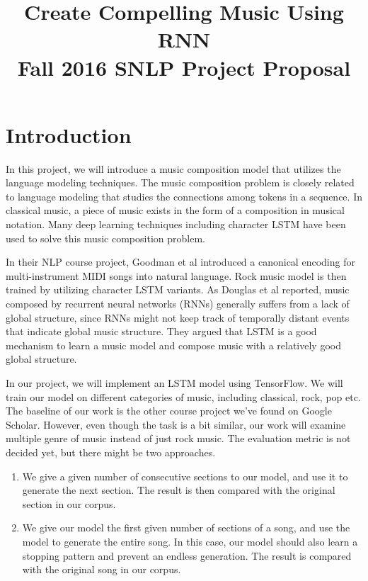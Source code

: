 \documentclass[10pt,journal]{IEEEtran}
\title{Create Compelling Music Using RNN\\
{\Large Fall 2016 SNLP Project Proposal}}
\author{
\IEEEauthorblockN{Qi Feng\IEEEauthorrefmark{1},
Zhiyu Feng\IEEEauthorrefmark{2},
Wenliang Zhao\IEEEauthorrefmark{3}
}

\IEEEauthorblockA{Department of Computer Science,
New York University\\
New York, NY\\
Email: \IEEEauthorrefmark{1}qf264@nyu.edu,
\IEEEauthorrefmark{2}zf499@nyu.edu,
\IEEEauthorrefmark{3}wz927@nyu.edu}}
\begin{document}
\maketitle
\section{Introduction}
In this project, we will introduce a music composition model that utilizes the language modeling techniques.
The music composition problem is closely related to language modeling that studies the connections among tokens in a sequence.
In classical music, a piece of music exists in the form of a composition in musical notation.
Many deep learning techniques including character LSTM have been used to solve this music composition problem.

In their NLP course project\cite{goodmancs}, Goodman et al introduced a canonical encoding for multi-instrument MIDI songs into natural language.
Rock music model is then trained by utilizing character LSTM variants.
As Douglas et al reported\cite{eck2002first}, music composed by recurrent neural networks (RNNs) generally suffers from a lack of global structure,
since RNNs might not keep track of temporally distant events that indicate global music structure.
They argued that LSTM is a good mechanism to learn a music model and compose music with a relatively good global structure.

In our project, we will implement an LSTM model using TensorFlow\cite{tensorflow2015-whitepaper}.
We will train our model on different categories of music, including classical, rock, pop etc.
The baseline of our work is the other course project we've found on Google Scholar\cite{goodmancs}.
However, even though the task is a bit similar, our work will examine multiple genre of music instead of just rock music.
The evaluation metric is not decided yet, but there might be two approaches.
\begin{enumerate}
  \item
  We give a given number of consecutive sections to our model, and use it to generate the next section.
  The result is then compared with the original section in our corpus.
  \item
  We give our model the first given number of sections of a song, and use the model to generate the entire song.
  In this case, our model should also learn a stopping pattern and prevent an endless generation.
  The result is compared with the original song in our corpus.
\end{enumerate}
\end{document}
